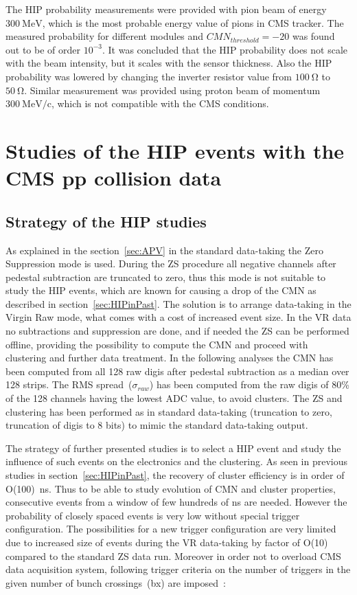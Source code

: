 The HIP probability measurements were provided with pion beam of energy $300~\mathrm{MeV}$, which is the most probable energy value of pions in CMS tracker. The measured probability for different modules and $CMN_{threshold}=-20$ was found out to be of order $10^{-3}$. It was concluded that the HIP probability does not scale with the beam intensity, but it scales with the sensor thickness. Also the HIP probability was lowered by changing the inverter resistor value from $100~\mathrm{\Omega}$ to  $50~\mathrm{\Omega}$. Similar measurement was provided using proton beam of momentum $300~\mathrm{MeV/c}$, which is not compatible with the CMS conditions.


\section{Studies of the HIP events with the CMS pp collision data}

\subsection{Strategy of the HIP studies}

As explained in the section~\ref{sec:APV} in the standard data-taking the Zero Suppression mode is used. During the ZS procedure all negative channels after pedestal subtraction are truncated to zero, thus this mode is not suitable to study the HIP events, which are known for causing a drop of the CMN as described in section~\ref{sec:HIPinPast}. The solution is to arrange data-taking in the Virgin Raw mode, what comes with a cost of increased event size. In the VR data no subtractions and suppression are done, and if needed the ZS can be performed offline, providing the possibility to compute the CMN and proceed with clustering and further data treatment. In the following analyses the CMN has been computed from all 128 raw digis after pedestal subtraction as a median over 128 strips. The RMS spread~($\sigma_{raw}$) has been computed from the raw digis of 80\% of the 128 channels having the lowest ADC value, to avoid clusters. The ZS and clustering has been performed as in standard data-taking (truncation to zero, truncation of digis to 8 bits) to mimic the standard data-taking output.

The strategy of further presented studies is to select a HIP event and study the influence of such events on the electronics and the clustering. As seen in previous studies in section~\ref{sec:HIPinPast}, the recovery of cluster efficiency is in order of O(100)~ns. Thus to be able to study evolution of CMN and cluster properties, consecutive events from a window of few hundreds of ns are needed. However the probability of closely spaced events is very low without special trigger configuration. The possibilities for a new trigger configuration are very limited due to increased size of events during the VR data-taking by factor of O(10) compared to the standard ZS data run. Moreover in order not to overload CMS data acquisition system, following trigger criteria on the number of triggers in the given number of bunch crossings~(bx) are imposed~\cite{website:VRtrigger}:

